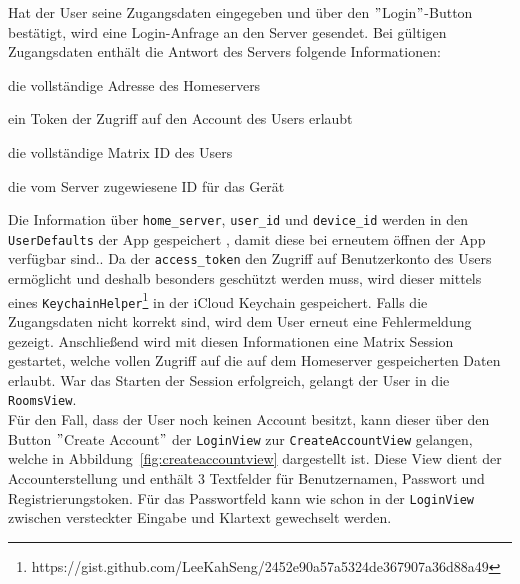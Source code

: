     Hat der User seine Zugangsdaten eingegeben und über den \("\)Login\("\)-Button bestätigt, wird eine Login-Anfrage an den Server gesendet.
    Bei gültigen Zugangsdaten enthält die Antwort des Servers folgende Informationen:
    \begin{description}[leftmargin=!,labelwidth=3cm]
        \item [home\_server] die vollständige Adresse des Homeservers
        \item [access\_token] ein Token der Zugriff auf den Account des Users erlaubt
        \item [user\_id] die vollständige Matrix ID des Users
        \item [device\_id] die vom Server zugewiesene ID für das Gerät
    \end{description}
    Die Information über \texttt{home\_server}, \texttt{user\_id} und \texttt{device\_id} werden in den \texttt{UserDefaults} der App gespeichert , damit diese bei erneutem öffnen der App verfügbar sind..
    Da der \texttt{access\_token} den Zugriff auf Benutzerkonto des Users ermöglicht und deshalb besonders geschützt werden muss, wird dieser mittels eines \texttt{KeychainHelper}\footnote{https://gist.github.com/LeeKahSeng/2452e90a57a5324de367907a36d88a49} in der iCloud Keychain gespeichert.
    Falls die Zugangsdaten nicht korrekt sind, wird dem User erneut eine Fehlermeldung gezeigt.
    Anschließend wird mit diesen Informationen eine Matrix Session gestartet, welche vollen Zugriff auf die auf dem Homeserver gespeicherten Daten erlaubt.
    War das Starten der Session erfolgreich, gelangt der User in die \texttt{RoomsView}.\\
    Für den Fall, dass der User noch keinen Account besitzt, kann dieser über den Button \("\)Create Account\("\) der \texttt{LoginView} zur \texttt{CreateAccountView} gelangen, welche in Abbildung~\ref{fig:createaccountview} dargestellt ist.
    Diese View dient der Accounterstellung und enthält 3 Textfelder für Benutzernamen, Passwort und Registrierungstoken.
    Für das Passwortfeld kann wie schon in der \texttt{LoginView} zwischen versteckter Eingabe und Klartext gewechselt werden.
